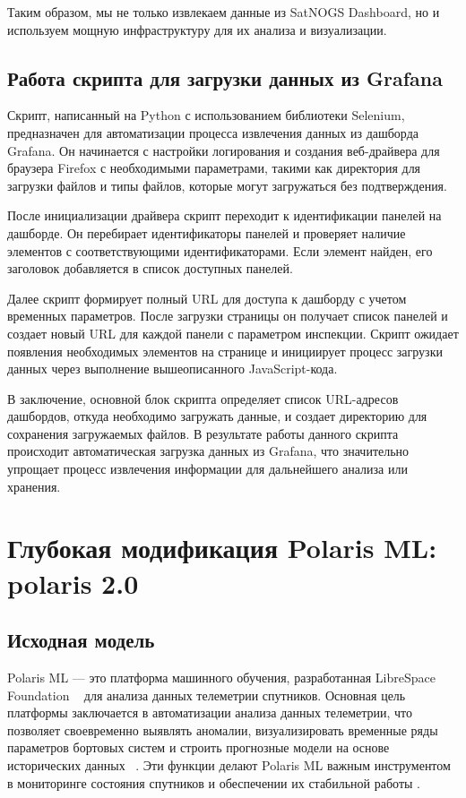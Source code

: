 \documentclass[14pt, a4paper]{bsu}
\begin{document}
Таким образом, мы не только извлекаем данные из SatNOGS Dashboard, но и
используем мощную инфраструктуру для их анализа и визуализации.

\section{Работа скрипта для загрузки данных из Grafana}

Скрипт, написанный на Python с использованием библиотеки Selenium,
предназначен для автоматизации процесса извлечения данных из дашборда
Grafana. Он начинается с настройки логирования и создания веб-драйвера для
браузера Firefox с необходимыми параметрами, такими как директория для
загрузки файлов и типы файлов, которые могут загружаться без подтверждения.

После инициализации драйвера скрипт переходит к идентификации панелей на
дашборде. Он перебирает идентификаторы панелей и проверяет наличие
элементов с соответствующими идентификаторами. Если элемент найден, его
заголовок добавляется в список доступных панелей.

Далее скрипт формирует полный URL для доступа к дашборду с учетом временных
параметров. После загрузки страницы он получает список панелей и создает
новый URL для каждой панели с параметром инспекции. Скрипт ожидает
появления необходимых элементов на странице и инициирует процесс загрузки
данных через выполнение вышеописанного JavaScript-кода.

В заключение, основной блок скрипта определяет список URL-адресов
дашбордов, откуда необходимо загружать данные, и создает директорию для
сохранения загружаемых файлов. В результате работы данного скрипта
происходит автоматическая загрузка данных из Grafana, что значительно
упрощает процесс извлечения информации для дальнейшего анализа или
хранения.


\newpage

\chapter{Глубокая модификация Polaris ML: polaris 2.0}

\section{Исходная модель}

Polaris ML — это платформа машинного обучения, разработанная LibreSpace
Foundation ~\cite{librespace_docs} для анализа данных телеметрии спутников.
Основная цель платформы заключается в автоматизации анализа данных телеметрии,
что позволяет своевременно выявлять аномалии, визуализировать временные ряды
параметров бортовых систем и строить прогнозные модели на основе исторических
данных ~\cite{ray_2002_bayesian}. Эти функции делают Polaris ML важным
инструментом в мониторинге состояния спутников и обеспечении их стабильной
работы \cite{polaris_ml_docs}.
\end{document}
